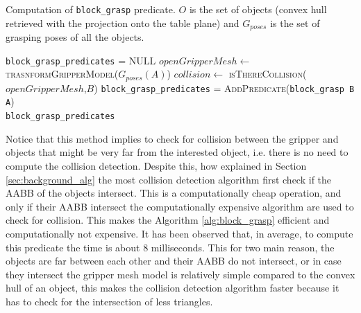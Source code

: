 \begin{algorithm}
\caption{Computation of \texttt{block\_grasp} predicate. $O$ is the set of objects (convex hull retrieved with the projection onto the table plane) and $G_{poses}$ is the set of grasping poses of all the objects.}\label{alg:block_grasp}
\begin{algorithmic}
  \texttt{block\_grasp\_predicates} = \textsc{NULL}
  \State $openGripperMesh \gets$ \textsc{trasnformGripperModel}($G_{poses}(A)$)
	\State $collision \gets$ \textsc{isThereCollision($openGripperMesh$,$B$)}
		\State \texttt{block\_grasp\_predicates} = \textsc{AddPredicate}(\texttt{block\_grasp B A})
	\EndIf
  \EndIf
\EndFor
\EndFor \\
\Return  \texttt{block\_grasp\_predicates}
\EndFunction
\end{algorithmic}
\end{algorithm}   
 
Notice that this method implies to check for collision between the gripper and objects that might be very far from the interested object, i.e. there is no need to compute the collision detection.  Despite this, how explained in Section \ref{sec:background_alg} the most collision detection algorithm first check if the AABB of the objects intersect. This is a computationally cheap operation, and only if their AABB intersect the computationally expensive algorithm are used to check for collision. This makes the Algorithm \ref{alg:block_grasp} efficient and computationally not expensive. It has been observed that, in average, to compute this predicate the time is about $8$ milliseconds. This for two main reason, the objects are far between each other and their AABB do not intersect, or in case they intersect the gripper mesh model is relatively simple compared to the convex hull of an object, this makes the collision detection algorithm faster because it has to check for the intersection of less triangles. 
 
